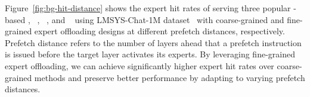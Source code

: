 %
% 
% 
Figure~\ref{fig:bg-hit-distance} shows the expert hit rates of serving three popular \MoE-based \LLMs, \mixtral~\cite{jiang2024mixtral}, \qwen~\cite{yang2024qwen2}, and \phimoe~\cite{abdin2024phi} using LMSYS-Chat-1M dataset~\cite{zheng2023lmsys} with coarse-grained and fine-grained expert offloading designs at different prefetch distances, respectively. 
Prefetch distance refers to the number of layers ahead that a prefetch instruction is issued before the target layer activates its experts. 
By leveraging fine-grained expert offloading, we can achieve significantly higher expert hit rates over coarse-grained methods and preserve better performance by adapting to varying prefetch distances.



